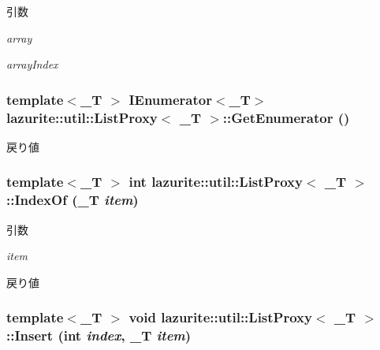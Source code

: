 \begin{DoxyParams}{引数}
\item[{\em array}]\item[{\em arrayIndex}]\end{DoxyParams}
\hypertarget{classlazurite_1_1util_1_1_list_proxy_3_01___t_01_4_abb661cdae591021dfd34cb2ebca92542}{
\subsubsection[{GetEnumerator}]{\setlength{\rightskip}{0pt plus 5cm}template$<$\_\-T $>$ IEnumerator$<$\_\-T$>$ lazurite::util::ListProxy$<$ \_\-T $>$::GetEnumerator ()}}
\label{classlazurite_1_1util_1_1_list_proxy_3_01___t_01_4_abb661cdae591021dfd34cb2ebca92542}
\begin{DoxyReturn}{戻り値}

\end{DoxyReturn}
\hypertarget{classlazurite_1_1util_1_1_list_proxy_3_01___t_01_4_a403991b14e1a2b032c52416ee53ab362}{
\subsubsection[{IndexOf}]{\setlength{\rightskip}{0pt plus 5cm}template$<$\_\-T $>$ int lazurite::util::ListProxy$<$ \_\-T $>$::IndexOf (\_\-T {\em item})}}
\label{classlazurite_1_1util_1_1_list_proxy_3_01___t_01_4_a403991b14e1a2b032c52416ee53ab362}

\begin{DoxyParams}{引数}
\item[{\em item}]\end{DoxyParams}
\begin{DoxyReturn}{戻り値}

\end{DoxyReturn}
\hypertarget{classlazurite_1_1util_1_1_list_proxy_3_01___t_01_4_a1747d5d46bfb99157e4cb18eb6981894}{
\subsubsection[{Insert}]{\setlength{\rightskip}{0pt plus 5cm}template$<$\_\-T $>$ void lazurite::util::ListProxy$<$ \_\-T $>$::Insert (int {\em index}, \/  \_\-T {\em item})}}
\label{classlazurite_1_1util_1_1_list_proxy_3_01___t_01_4_a1747d5d46bfb99157e4cb18eb6981894}

